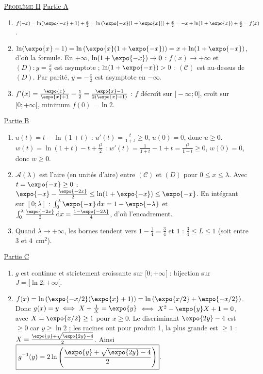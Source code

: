 \begin{corrige}
\noindent \underline{\textsc{Probl\`eme II}} \newline
\underline{Partie A}
\begin{enumerate}
\item $f(-x) = \ln(\expo{-x} + 1) + \frac{x}{2} = \ln\left(\expo{-x}(1 + \expo{x})\right) + \frac{x}{2} = -x + \ln(1 + \expo{x}) + \frac{x}{2} = f(x)$.
\item $\ln(\expo{x} + 1) = \ln\left(\expo{x}(1 + \expo{-x})\right) = x + \ln(1 + \expo{-x})$, d'o\`u la formule.
      En $+\infty$, $\ln(1 + \expo{-x}) \to 0$ : $f(x) \to +\infty$ et $(D) : y = \frac{x}{2}$ est asymptote ;
      $\ln(1 + \expo{-x}) > 0$ : $(\mathscr{C})$ est au-dessus de $(D)$. Par parit\'e, $y = -\frac{x}{2}$ est asymptote en $-\infty$.
\item $f'(x) = \frac{\expo{x}}{\expo{x} + 1} - \frac{1}{2} = \frac{\expo{x} - 1}{2(\expo{x} + 1)}$ : $f$ d\'ecro\^it sur $]-\infty ; 0]$, cro\^it sur $[0 ; +\infty[$,
      minimum $f(0) = \ln 2$.
\end{enumerate}
\underline{Partie B}
\begin{enumerate}
\item $u(t) = t - \ln(1 + t)$ : $u'(t) = \frac{t}{1 + t} \geq 0$, $u(0) = 0$, donc $u \geq 0$.
      $w(t) = \ln(1 + t) - t + \frac{t^2}{2}$ : $w'(t) = \frac{1}{1 + t} - 1 + t = \frac{t^2}{1 + t} \geq 0$, $w(0) = 0$, donc $w \geq 0$.
\item $\mathscr{A}(\lambda)$ est l'aire (en unit\'es d'aire) entre $(\mathscr{C})$ et $(D)$ pour $0 \leq x \leq \lambda$. Avec $t = \expo{-x} \geq 0$ :
      $\expo{-x} - \frac{\expo{-2x}}{2} \leq \ln(1 + \expo{-x}) \leq \expo{-x}$. En int\'egrant sur $[0 ; \lambda]$ :
      $\int_0^\lambda \expo{-x}\,\mathrm{d}x = 1 - \expo{-\lambda}$ et $\int_0^\lambda \frac{\expo{-2x}}{2}\,\mathrm{d}x = \frac{1 - \expo{-2\lambda}}{4}$,
      d'o\`u l'encadrement.
\item Quand $\lambda \to +\infty$, les bornes tendent vers $1 - \frac{1}{4} = \frac{3}{4}$ et $1$ : $\frac{3}{4} \leq L \leq 1$
      (soit entre $3$ et $4$~cm$^2$).
\end{enumerate}
\underline{Partie C}
\begin{enumerate}
\item $g$ est continue et strictement croissante sur $[0 ; +\infty[$ : bijection sur $J = [\ln 2 ; +\infty[$.
\item $f(x) = \ln\left(\expo{-x/2}(\expo{x} + 1)\right) = \ln\left(\expo{x/2} + \expo{-x/2}\right)$. Donc $g(x) = y \iff X + \frac{1}{X} = \expo{y}$
      $\iff X^2 - \expo{y}X + 1 = 0$, avec $X = \expo{x/2} \geq 1$ pour $x \geq 0$. Le discriminant $\expo{2y} - 4$ est $\geq 0$ car $y \geq \ln 2$ ;
      les racines ont pour produit 1, la plus grande est $\geq 1$ : $X = \frac{\expo{y} + \sqrt{\expo{2y} - 4}}{2}$.
      Ainsi $\boxed{g^{-1}(y) = 2\ln\left(\frac{\expo{y} + \sqrt{\expo{2y} - 4}}{2}\right)}$.
\end{enumerate}


\end{corrige}
